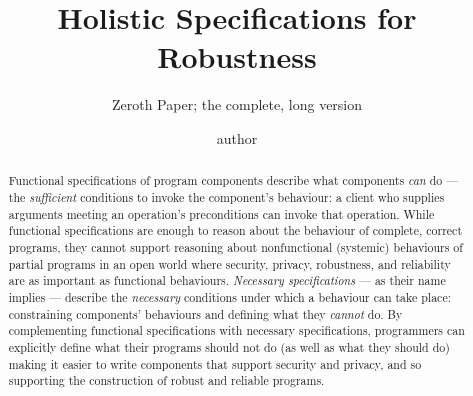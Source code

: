 \documentclass[acmsmall,screen]{acmart}
\begin{document}

\author{ author}
 


\title{Holistic Specifications for Robustness}
\subtitle{Zeroth Paper; the complete, long version}




\begin{abstract}
Functional specifications of program components describe what
components \emph{can} do --- the \emph{sufficient} conditions to
invoke the component's behaviour: a client who supplies arguments
meeting an operation's preconditions can invoke that operation. While
functional specifications are enough to reason about the behaviour of
complete, correct programs, they cannot support reasoning about
nonfunctional (systemic) behaviours of partial programs in an open
world where security, privacy, robustness, and reliability are as
important as functional behaviours. \emph{Necessary specifications}
--- as their name implies --- describe the \emph{necessary}
conditions under which a behaviour can take place: constraining
components' behaviours and defining what they \emph{cannot} do.  By
complementing functional specifications with necessary specifications,
programmers can explicitly define what their programs should not do
(as well as what they should do) making it easier to write components
that support security and privacy, and so supporting the construction
of robust and reliable programs.



\end{abstract}
\end{document}
